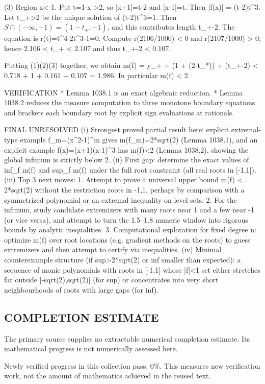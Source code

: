 (3) Region x<-1.  Put t=1-x >2, so |x+1|=t-2 and |x-1|=t. Then
  |f(x)| = (t-2)t^3.
Let t_+>2 be the unique solution of (t-2)t^3=1. Then \(S\cap(-\infty,-1) = (1-t_+, -1)\), and this contributes length t_+-2.
The equation is r(t)=t^4-2t^3-1=0. Compute r(2106/1000) < 0 and r(2107/1000) > 0; hence 2.106 < t_+ < 2.107 and thus t_+-2 < 0.107.

Putting (1)(2)(3) together, we obtain
  m(f) = y_+ + (1 + (2-t_*)) + (t_+-2)
      < 0.718 + 1 + 0.161 + 0.107
      = 1.986.
In particular m(f) < 2.

VERIFICATION
* Lemma 1038.1 is an exact algebraic reduction.
* Lemma 1038.2 reduces the measure computation to three monotone boundary equations and brackets each boundary root by explicit sign evaluations at rationals.

FINAL
UNRESOLVED
(i) Strongest proved partial result here: explicit extremal-type example f_m=(x^2-1)^m gives m(f_m)=2*sqrt(2) (Lemma 1038.1), and an explicit example f(x)=(x+1)(x-1)^3 has m(f)<2 (Lemma 1038.2), showing the global infimum is strictly below 2.
(ii) First gap: determine the exact values of inf_f m(f) and sup_f m(f) under the full root constraint (all real roots in [-1,1]).
(iii) Top 3 next moves:
  1. Attempt to prove a universal upper bound m(f) <= 2*sqrt(2) without the restriction roots in {-1,1}, perhaps by comparison with a symmetrized polynomial or an extremal inequality on level sets.
  2. For the infimum, study candidate extremizers with many roots near 1 and a few near -1 (or vice versa), and attempt to turn the 1.5--1.8 numeric window into rigorous bounds by analytic inequalities.
  3. Computational exploration for fixed degree n: optimize m(f) over root locations (e.g. gradient methods on the roots) to guess extremizers and then attempt to certify via inequalities.
(iv) Minimal counterexample structure (if sup>2*sqrt(2) or inf smaller than expected): a sequence of monic polynomials with roots in [-1,1] whose |f|<1 set either stretches far outside [-sqrt(2),sqrt(2)] (for sup) or concentrates into very short neighbourhoods of roots with large gaps (for inf).



\subsection*{COMPLETION ESTIMATE}
The primary source supplies no extractable numerical completion estimate. Its mathematical progress is not numerically assessed here.

Newly verified progress in this collection pass: $0\%$. This measures new verification work, not the amount of mathematics achieved in the reused text.
